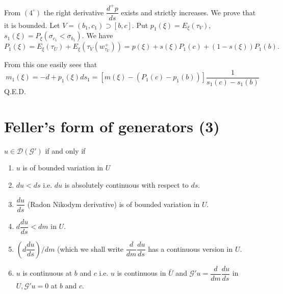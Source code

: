 From $(4^\circ)$ the right derivative $\dfrac{d^+ p}{ds}$ exists and
strictly increases.\pageoriginale 
We prove that it is bounded. Let $V = (b_1, c_1)
\supset [b, c]$. Put $p_1(\xi) = E_\xi (\tau_V)$, $s_1 (\xi) = P_\xi
(\sigma_{c_1} < \sigma_{b_1})$. We have  
$$
P_1(\xi) = E_\xi (\tau_U) + E_\xi (\tau_{V}(w^+_{\tau _{U}})) = p(\xi) + s (\xi)
P_1 (c) + (1-s(\xi)) P_1 (b).  
$$  
 
From this one easily sees that 
$$
m_1 (\xi) =- {d+p_1(\xi)}{ds_1} = [m(\xi) - (P_1(c)-p_1 (b))]
\frac{1}{s_1(c)-s_1 (b)} 
$$
\hfill{Q.E.D.}

\section{Feller's form of generators (3)}\label{chap6-sec6} %

 \begin{theorem*}[Feller]
 $u \in \mathscr{D} (\mathscr{G}')$ if and only if
   \begin{enumerate}[\rm (1)]
   \item $u$ is of bounded variation in $U$

   \item $du < ds$ i.e. $du$ is absolutely continuous with respect to $ds$.

   \item $\dfrac{du}{ds}$ (Radon Nikodym derivative) is of bounded
     variation in $U$. 

   \item $d\dfrac{du}{ds}<dm $ in $U$.

   \item $(d\dfrac{du}{ds})/dm $ (which we shall write
     $\dfrac{d}{dm}\dfrac{du}{ds}$ has a continuous version in $U$. 

   \item $u$ is continuous at $b$ and $c$ i.e. $u$ is continuous in
     $\bar{U}$ and $\mathscr{G}' u = \dfrac{d}{dm} \dfrac{du}{ds}$ in
     $U, \mathscr{G}' u =0$ at $b$ and $c$.  
\end{enumerate} 
 \end{theorem*}
  
